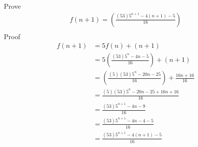 \documentclass{article}
\begin{document}
\begin{enumerate}
  Prove
  \begin{align*}
    f(n+1) =  (\frac{ (53)5^{n + 1}   - 4(n+1) - 5 }{ 16})  \\
  \end{align*}
  Proof
  \begin{align*}
    f(n+1) &=  5f(n) + (n + 1)  \\
    &=  5 (\frac{ (53)5^n   - 4n - 5 }{ 16}) + (n + 1)  \\
    &=   (\frac{ (5)(53)5^n   - 20n - 25 }{ 16}) + \frac{16n + 16}{16} \\
    &=   \frac{ (5)(53)5^n   - 20n - 25 + 16n + 16 }{ 16} \\
    &=   \frac{ (53)5^{n+1}   - 4n - 9 }{ 16} \\
    &=   \frac{ (53)5^{n+1}   - 4n - 4 - 5  }{ 16} \\
    &=   \frac{ (53)5^{n+1}   - 4(n + 1) - 5  }{ 16} \\
  \end{align*}

\end{enumerate}
\end{document}
